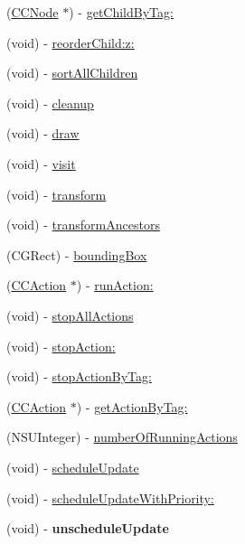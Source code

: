 \begin{DoxyCompactItemize}
(\hyperlink{class_c_c_node}{C\-C\-Node} $\ast$) -\/ \hyperlink{class_c_c_node_ae6c33c3f1dc67730a492ac8b99efa151}{get\-Child\-By\-Tag\-:}
\item 
(void) -\/ \hyperlink{class_c_c_node_ab35e8e10f73eb3ac074f5ef0cc087e78}{reorder\-Child\-:z\-:}
\item 
(void) -\/ \hyperlink{class_c_c_node_a9aa8035fd4681485a5166590115d7e49}{sort\-All\-Children}
\item 
(void) -\/ \hyperlink{class_c_c_node_ad7d1aee7e97990e049bb380a1a63ad26}{cleanup}
\item 
(void) -\/ \hyperlink{class_c_c_node_ad1310bc9561e8ceaa15d37772da4e8c9}{draw}
\item 
(void) -\/ \hyperlink{class_c_c_node_a36d86c671de265dc7e2a9f7a051d2428}{visit}
\item 
(void) -\/ \hyperlink{class_c_c_node_a28462e8ba70bb61dc4f301b1180ec7e5}{transform}
\item 
(void) -\/ \hyperlink{class_c_c_node_ab953e7552e84c54e2cb445ebc629e983}{transform\-Ancestors}
\item 
(C\-G\-Rect) -\/ \hyperlink{class_c_c_node_a22b9004c0baaffd656a46d0840e1c934}{bounding\-Box}
\item 
(\hyperlink{interface_c_c_action}{C\-C\-Action} $\ast$) -\/ \hyperlink{class_c_c_node_afba9468e339b4222bce6705cd328351d}{run\-Action\-:}
\item 
(void) -\/ \hyperlink{class_c_c_node_a24f2916259df943e3f13cdd702673962}{stop\-All\-Actions}
\item 
(void) -\/ \hyperlink{class_c_c_node_a6d2592ff2d9c559f25b4b1a6c01a5dc8}{stop\-Action\-:}
\item 
(void) -\/ \hyperlink{class_c_c_node_a5e446f4095835d4a1d5a497fa7d9c338}{stop\-Action\-By\-Tag\-:}
\item 
(\hyperlink{interface_c_c_action}{C\-C\-Action} $\ast$) -\/ \hyperlink{class_c_c_node_a7100667a2dd3d9f6f421001afc9f734f}{get\-Action\-By\-Tag\-:}
\item 
(N\-S\-U\-Integer) -\/ \hyperlink{class_c_c_node_a83604b800f210921e8b8d6d478d98299}{number\-Of\-Running\-Actions}
\item 
(void) -\/ \hyperlink{class_c_c_node_a3b9fd5b63a2f3e3ec56e40e13994fba7}{schedule\-Update}
\item 
(void) -\/ \hyperlink{class_c_c_node_a3abe343042d72b5bff61ee5d43f4e651}{schedule\-Update\-With\-Priority\-:}
\item 
\hypertarget{class_c_c_node_aa076e0ef43527bd97e5a32512d52e12a}{(void) -\/ {\bfseries unschedule\-Update}}\label{class_c_c_node_aa076e0ef43527bd97e5a32512d52e12a}


\end{DoxyCompactItemize}
